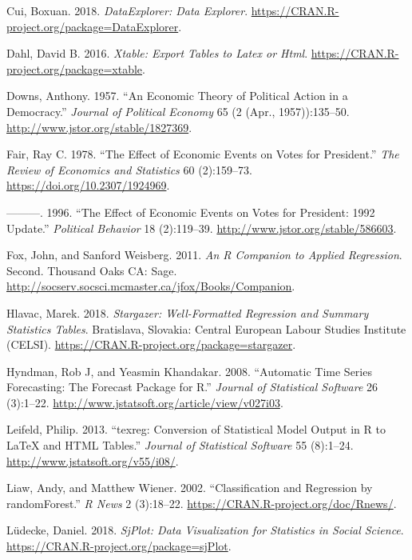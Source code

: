\documentclass[11,]{article}
\begin{document}
\leavevmode\hypertarget{ref-DataExplorer}{}%
Cui, Boxuan. 2018. \emph{DataExplorer: Data Explorer}.
\url{https://CRAN.R-project.org/package=DataExplorer}.

\leavevmode\hypertarget{ref-xtable}{}%
Dahl, David B. 2016. \emph{Xtable: Export Tables to Latex or Html}.
\url{https://CRAN.R-project.org/package=xtable}.

\leavevmode\hypertarget{ref-downs_economic}{}%
Downs, Anthony. 1957. ``An Economic Theory of Political Action in a
Democracy.'' \emph{Journal of Political Economy} 65 (2 (Apr.,
1957)):135--50. \url{http://www.jstor.org/stable/1827369}.

\leavevmode\hypertarget{ref-fair_effect_1978}{}%
Fair, Ray C. 1978. ``The Effect of Economic Events on Votes for
President.'' \emph{The Review of Economics and Statistics} 60
(2):159--73. \url{https://doi.org/10.2307/1924969}.

\leavevmode\hypertarget{ref-fair_effect_1996}{}%
---------. 1996. ``The Effect of Economic Events on Votes for President:
1992 Update.'' \emph{Political Behavior} 18 (2):119--39.
\url{http://www.jstor.org/stable/586603}.

\leavevmode\hypertarget{ref-car}{}%
Fox, John, and Sanford Weisberg. 2011. \emph{An R Companion to Applied
Regression}. Second. Thousand Oaks CA: Sage.
\url{http://socserv.socsci.mcmaster.ca/jfox/Books/Companion}.

\leavevmode\hypertarget{ref-stargazer}{}%
Hlavac, Marek. 2018. \emph{Stargazer: Well-Formatted Regression and
Summary Statistics Tables}. Bratislava, Slovakia: Central European
Labour Studies Institute (CELSI).
\url{https://CRAN.R-project.org/package=stargazer}.

\leavevmode\hypertarget{ref-forecast}{}%
Hyndman, Rob J, and Yeasmin Khandakar. 2008. ``Automatic Time Series
Forecasting: The Forecast Package for R.'' \emph{Journal of Statistical
Software} 26 (3):1--22.
\url{http://www.jstatsoft.org/article/view/v027i03}.

\leavevmode\hypertarget{ref-texreg}{}%
Leifeld, Philip. 2013. ``texreg: Conversion of Statistical Model Output
in R to LaTeX and HTML Tables.'' \emph{Journal of Statistical Software}
55 (8):1--24. \url{http://www.jstatsoft.org/v55/i08/}.

\leavevmode\hypertarget{ref-randomForest}{}%
Liaw, Andy, and Matthew Wiener. 2002. ``Classification and Regression by
randomForest.'' \emph{R News} 2 (3):18--22.
\url{https://CRAN.R-project.org/doc/Rnews/}.

\leavevmode\hypertarget{ref-sjPlot}{}%
Lüdecke, Daniel. 2018. \emph{SjPlot: Data Visualization for Statistics
in Social Science}. \url{https://CRAN.R-project.org/package=sjPlot}.
\end{document}

